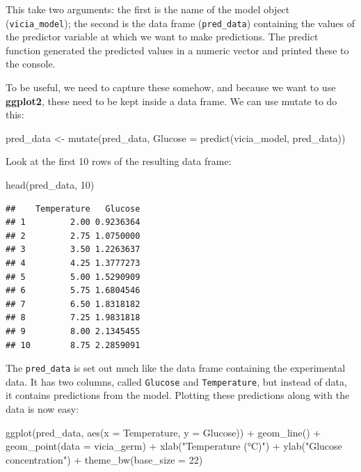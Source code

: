 \documentclass[
]{book}
\newenvironment{Shaded}{\begin{snugshade}}{\end{snugshade}}
\newcommand{\AttributeTok}[1]{\textcolor[rgb]{0.77,0.63,0.00}{#1}}
\newcommand{\DecValTok}[1]{\textcolor[rgb]{0.00,0.00,0.81}{#1}}
\newcommand{\FunctionTok}[1]{\textcolor[rgb]{0.00,0.00,0.00}{#1}}
\newcommand{\NormalTok}[1]{#1}
\newcommand{\OtherTok}[1]{\textcolor[rgb]{0.56,0.35,0.01}{#1}}
\newcommand{\SpecialCharTok}[1]{\textcolor[rgb]{0.00,0.00,0.00}{#1}}
\newcommand{\StringTok}[1]{\textcolor[rgb]{0.31,0.60,0.02}{#1}}
\begin{document}
This take two arguments: the first is the name of the model object (\texttt{vicia\_model}); the second is the data frame (\texttt{pred\_data}) containing the values of the predictor variable at which we want to make predictions. The predict function generated the predicted values in a numeric vector and printed these to the console.

To be useful, we need to capture these somehow, and because we want to use \textbf{ggplot2}, these need to be kept inside a data frame. We can use mutate to do this:

\begin{Shaded}
\begin{Highlighting}[]
\NormalTok{pred\_data }\OtherTok{\textless{}{-}} \FunctionTok{mutate}\NormalTok{(pred\_data, }\AttributeTok{Glucose =} \FunctionTok{predict}\NormalTok{(vicia\_model, pred\_data))}
\end{Highlighting}
\end{Shaded}

Look at the first 10 rows of the resulting data frame:

\begin{Shaded}
\begin{Highlighting}[]
\FunctionTok{head}\NormalTok{(pred\_data, }\DecValTok{10}\NormalTok{)}
\end{Highlighting}
\end{Shaded}

\begin{verbatim}
##    Temperature   Glucose
## 1         2.00 0.9236364
## 2         2.75 1.0750000
## 3         3.50 1.2263637
## 4         4.25 1.3777273
## 5         5.00 1.5290909
## 6         5.75 1.6804546
## 7         6.50 1.8318182
## 8         7.25 1.9831818
## 9         8.00 2.1345455
## 10        8.75 2.2859091
\end{verbatim}

The \texttt{pred\_data} is set out much like the data frame containing the experimental data. It has two columns, called \texttt{Glucose} and \texttt{Temperature}, but instead of data, it contains predictions from the model. Plotting these predictions along with the data is now easy:

\begin{Shaded}
\begin{Highlighting}[]
\FunctionTok{ggplot}\NormalTok{(pred\_data, }\FunctionTok{aes}\NormalTok{(}\AttributeTok{x =}\NormalTok{ Temperature, }\AttributeTok{y =}\NormalTok{ Glucose)) }\SpecialCharTok{+} 
  \FunctionTok{geom\_line}\NormalTok{() }\SpecialCharTok{+} \FunctionTok{geom\_point}\NormalTok{(}\AttributeTok{data =}\NormalTok{ vicia\_germ) }\SpecialCharTok{+} 
  \FunctionTok{xlab}\NormalTok{(}\StringTok{"Temperature (°C)"}\NormalTok{) }\SpecialCharTok{+} \FunctionTok{ylab}\NormalTok{(}\StringTok{"Glucose concentration"}\NormalTok{) }\SpecialCharTok{+} 
  \FunctionTok{theme\_bw}\NormalTok{(}\AttributeTok{base\_size =} \DecValTok{22}\NormalTok{)}
\end{Highlighting}
\end{Shaded}
\end{document}
